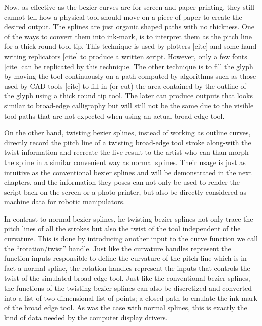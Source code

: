     Now, as effective as the bezier curves are for screen and paper printing, they still cannot tell how a physical tool should move on a piece of paper to create the desired output. The splines are just organic shaped paths with no thickness. One of the ways to convert them into ink-mark, is to interpret them as the pitch line for a thick round tool tip. This technique is used by plotters [cite] and some hand writing replicators [cite] to produce a written script. However, only a few fonts [cite] can be replicated by this technique. The other technique is to fill the glyph by moving the tool continuously on a path computed by algorithms such as those used by CAD tools [cite] to fill in (or cut) the area contained by the outline of the glyph using a thick round tip tool. The later can produce outputs that looks similar to broad-edge calligraphy but will still not be the same due to the visible tool paths that are not expected when using an actual broad edge tool.


    On the other hand, twisting bezier splines, instead of working as outline curves, directly record the pitch line of a twisting broad-edge tool stroke along-with the twist information and recreate the live result to the artist who can than morph the spline in a similar convenient way as normal splines. Their usage is just as intuitive as the conventional bezier splines and will be demonstrated in the next chapters, and the information they poses can not only be used to render the script back on the screen or a photo printer, but also be directly considered as machine data for robotic manipulators.

    In contrast to normal bezier splines, he twisting bezier splines not only trace the pitch lines of all the strokes but also the twist of the tool independent of the curvature. This is done by introducing another input to the curve function we call the ``rotation/twist'' handle. Just like the curvature handles represent the function inputs responsible to define the curvature of the pitch line which is in-fact a normal spline, the rotation handles represent the inputs that controls the twist of the simulated broad-edge tool. Just like the conventional bezier splines, the functions of the twisting bezier splines can also be discretized and converted into a list of two dimensional list of points; a closed path to emulate the ink-mark of the broad edge tool. As was the case with normal splines, this is exactly the kind of data needed by the computer display drivers.

